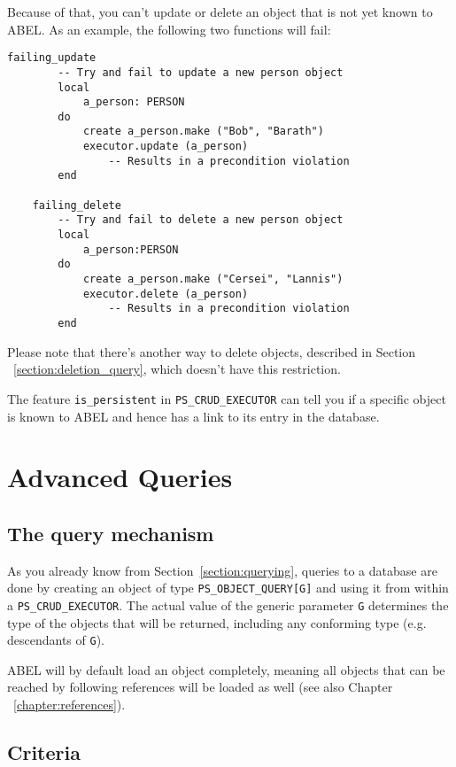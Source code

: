 \documentclass[a4paper,12pt]{report}
\begin{document}
Because of that, you can't update or delete an object that is not yet known to ABEL.
As an example, the following two functions will fail:

\begin{lstlisting}[language=OOSC2Eiffel, captionpos=b, caption={Failing updates and deletes.}, label={lst:failing_update_delete}]
	failing_update
		-- Try and fail to update a new person object
		local
			a_person: PERSON
		do
			create a_person.make ("Bob", "Barath")
			executor.update (a_person)
				-- Results in a precondition violation
		end

	failing_delete
		-- Try and fail to delete a new person object
		local
			a_person:PERSON
		do
			create a_person.make ("Cersei", "Lannis")
			executor.delete (a_person) 
				-- Results in a precondition violation
		end
\end{lstlisting}

Please note that there's another way to delete objects, described in Section ~\ref{section:deletion_query}, which doesn't have this restriction.

The feature \lstinline{is_persistent} in \lstinline!PS_CRUD_EXECUTOR! can tell you if a specific object is known to ABEL and hence has a link to its entry in the database.

\chapter{Advanced Queries}
\label{sec:advanced_queries}

\section{The query mechanism}

As you already know from Section~\ref{section:querying}, queries to a database are done by creating an object of type  \lstinline!PS_OBJECT_QUERY[G]! and using it from within a \lstinline!PS_CRUD_EXECUTOR!.
The actual value of the generic parameter \lstinline!G! determines the type of the objects that will be returned, including any conforming type (e.g. descendants of \lstinline!G!).

ABEL will by default load an object completely, meaning all objects that can be reached by following references will be loaded as well (see also Chapter ~\ref{chapter:references}).

\section{Criteria}
\end{document}
